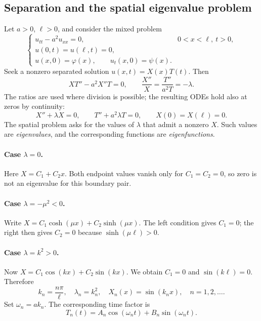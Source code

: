 \documentclass[11pt,a4paper]{article}
\newif\ifteachernotes\teachernotesfalse
\newcommand{\teachernote}[1]{\ifteachernotes\par\smallskip
  \noindent\textit{Instructor note.} #1\par\smallskip\fi}
\begin{document}
\subsection{Separation and the spatial eigenvalue problem}
Let $a>0$, $\ell>0$, and consider the mixed problem
\begin{equation}\label{eq:fixedproblem}
 \begin{cases}
 u_{tt}-a^2u_{xx}=0,&0<x<\ell,\ t>0,\\
 u(0,t)=u(\ell,t)=0,\\
 u(x,0)=\varphi(x),\qquad u_t(x,0)=\psi(x).
 \end{cases}
\end{equation}
Seek a nonzero separated solution $u(x,t)=X(x)T(t)$. Then
\begin{equation}
 XT''-a^2X''T=0,\qquad \frac{X''}{X}=\frac{T''}{a^2T}=-\lambda.
\end{equation}
The ratios are used where division is possible; the resulting ODEs hold also
at zeros by continuity:
\begin{equation}\label{eq:separated}
 X''+\lambda X=0,\qquad T''+a^2\lambda T=0,
 \qquad X(0)=X(\ell)=0.
\end{equation}
The spatial problem asks for the values of $\lambda$ that admit a nonzero $X$.
Such values are \emph{eigenvalues}, and the corresponding functions are
\emph{eigenfunctions}.
\teachernote{The fixed-end condition is $X(\ell)=0$. A derivative condition
 $X'(\ell)=0$ describes a different endpoint and produces a different spectrum.}

\paragraph{Case $\lambda=0$.}
Here $X=C_1+C_2x$. Both endpoint values vanish only for $C_1=C_2=0$, so zero
is not an eigenvalue for this boundary pair.

\paragraph{Case $\lambda=-\mu^2<0$.}
Write $X=C_1\cosh(\mu x)+C_2\sinh(\mu x)$. The left condition gives $C_1=0$;
the right then gives $C_2=0$ because $\sinh(\mu\ell)>0$.

\paragraph{Case $\lambda=k^2>0$.}
Now $X=C_1\cos(kx)+C_2\sin(kx)$. We obtain $C_1=0$ and
$\sin(k\ell)=0$. Therefore
\begin{equation}\label{eq:sinespectrum}
 \boxed{k_n=\frac{n\pi}{\ell},\quad \lambda_n=k_n^2,\quad
              X_n(x)=\sin(k_nx),\quad n=1,2,\ldots.}
\end{equation}
Set $\omega_n=ak_n$. The corresponding time factor is
\begin{equation}
 T_n(t)=A_n\cos(\omega_nt)+B_n\sin(\omega_nt).
\end{equation}
\end{document}
